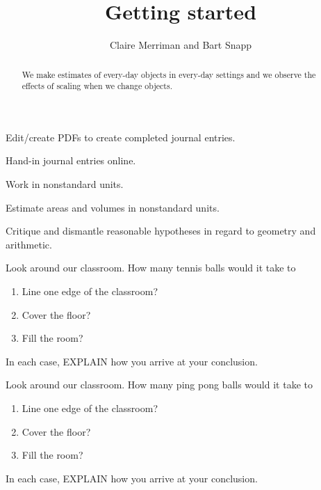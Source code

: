 \documentclass[handout,noauthor,nooutcomes,hints]{ximera}
\title{Getting started}
\author{Claire Merriman and Bart Snapp}
\begin{document}
\begin{abstract}
  We make estimates of every-day objects in every-day settings and we
  observe the effects of scaling when we change objects.
\end{abstract}
\maketitle



\begin{listOutcomes}
\item{Edit/create PDFs to create completed journal entries.}
\item{Hand-in journal entries online.}
\item{Work in nonstandard units.}
\item{Estimate areas and volumes in nonstandard units.}
\item{Critique and dismantle reasonable hypotheses in regard to geometry and arithmetic.}
\end{listOutcomes}

\mynewpage


\begin{question}
Look around our classroom. How many tennis balls would it take to
\begin{enumerate}
\item Line one edge of the classroom?
 \item Cover the floor?
 \item Fill the room?
\end{enumerate}
In each case, EXPLAIN how you arrive at your conclusion.
\end{question}
\mynewpage





\begin{question}
Look around our classroom. How many ping pong balls would it take to
\begin{enumerate}
\item Line one edge of the classroom?
\item Cover the floor?
\item Fill the room?
\end{enumerate}
In each case,  EXPLAIN how you arrive at your conclusion.
\end{question}
\mynewpage
\end{document}
